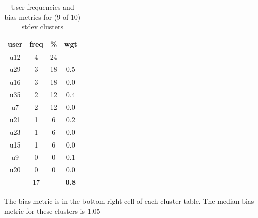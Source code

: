 \begin{table}
\begin{tabular}{ |c|c|c|c| }
	\hline
	\textbf{user} & \textbf{freq} & \textbf{\%} & \textbf{wgt} \\
	\hline
	u12 & 4 & 24 & -- \\
	u29 & 3 & 18 & 0.5 \\
	u16 & 3 & 18 & 0.0 \\
	u35 & 2 & 12 & 0.4 \\
	u7 & 2 & 12 & 0.0 \\
	u21 & 1 & 6 & 0.2 \\
	u23 & 1 & 6 & 0.0 \\
	u15 & 1 & 6 & 0.0 \\
	u9 & 0 & 0 & 0.1 \\
	u20 & 0 & 0 & 0.0 \\
	 & 17 & & \textbf{0.8} \\
	\hline
\end{tabular}
\caption{User frequencies and bias metrics for (9 of 10) stdev clusters}
{\small The bias metric is in the bottom-right cell of each cluster table. The median bias metric for these clusters is 1.05}
\end{table}

